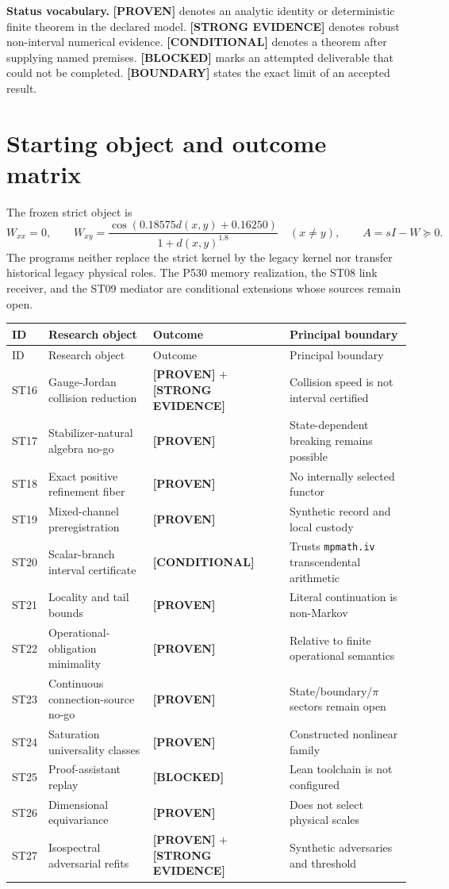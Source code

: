 \documentclass[11pt,a4paper]{article}
\newcommand{\proven}{\textcolor{green!40!black}{\textbf{[PROVEN]}}}
\newcommand{\strong}{\textcolor{blue!70!black}{\textbf{[STRONG EVIDENCE]}}}
\newcommand{\conditional}{\textcolor{black!60}{\textbf{[CONDITIONAL]}}}
\newcommand{\blocked}{\textcolor{red!72!black}{\textbf{[BLOCKED]}}}
\newcommand{\boundary}{\textcolor{orange!80!black}{\textbf{[BOUNDARY]}}}
\begin{document}
\textbf{Status vocabulary.} \proven{} denotes an analytic identity or deterministic finite theorem in the declared model. \strong{} denotes robust non-interval numerical evidence. \conditional{} denotes a theorem after supplying named premises. \blocked{} marks an attempted deliverable that could not be completed. \boundary{} states the exact limit of an accepted result.

\tableofcontents
\newpage

\section{Starting object and outcome matrix}

The frozen strict object is
\[
W_{xx}=0,\qquad W_{xy}=\frac{\cos(0.18575d(x,y)+0.16250)}{1+d(x,y)^{1.8}}\quad(x\ne y),
\qquad A=sI-W\succeq0.
\]
The programs neither replace the strict kernel by the legacy kernel nor transfer historical legacy physical roles. The P530 memory realization, the ST08 link receiver, and the ST09 mediator are conditional extensions whose sources remain open.

\small
\begin{longtable}{@{}p{}p{}p{}p{}@{}}
\toprule
ID & Research object & Outcome & Principal boundary\\
\midrule
\endfirsthead
\toprule
ID & Research object & Outcome & Principal boundary\\
\midrule
\endhead
ST16 & Gauge-Jordan collision reduction & \proven{} $+$ \strong{} & Collision speed is not interval certified\\
ST17 & Stabilizer-natural algebra no-go & \proven{} & State-dependent breaking remains possible\\
ST18 & Exact positive refinement fiber & \proven{} & No internally selected functor\\
ST19 & Mixed-channel preregistration & \proven{} & Synthetic record and local custody\\
ST20 & Scalar-branch interval certificate & \conditional{} & Trusts \texttt{mpmath.iv} transcendental arithmetic\\
ST21 & Locality and tail bounds & \proven{} & Literal continuation is non-Markov\\
ST22 & Operational-obligation minimality & \proven{} & Relative to finite operational semantics\\
ST23 & Continuous connection-source no-go & \proven{} & State/boundary/$\pi$ sectors remain open\\
ST24 & Saturation universality classes & \proven{} & Constructed nonlinear family\\
ST25 & Proof-assistant replay & \blocked{} & Lean toolchain is not configured\\
ST26 & Dimensional equivariance & \proven{} & Does not select physical scales\\
ST27 & Isospectral adversarial refits & \proven{} $+$ \strong{} & Synthetic adversaries and threshold\\
\bottomrule
\end{longtable}
\normalsize
\end{document}
